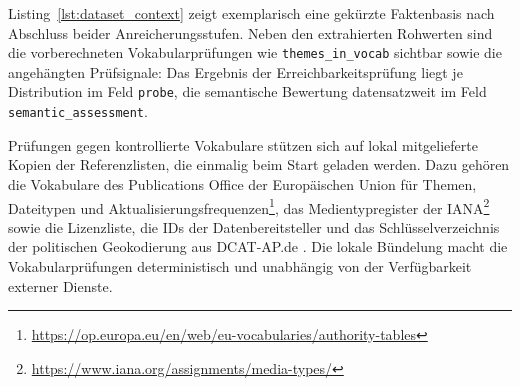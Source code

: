 
Listing~\ref{lst:dataset_context} zeigt exemplarisch eine gekürzte Faktenbasis nach Abschluss beider Anreicherungsstufen. Neben den extrahierten Rohwerten sind die vorberechneten Vokabularprüfungen wie \texttt{themes\_in\_vocab} sichtbar sowie die angehängten Prüfsignale: Das Ergebnis der Erreichbarkeitsprüfung liegt je Distribution im Feld \texttt{probe}, die semantische Bewertung datensatzweit im Feld \texttt{semantic\_assessment}.

\pagebreak

Prüfungen gegen kontrollierte Vokabulare stützen sich auf lokal mitgelieferte Kopien der Referenzlisten, die einmalig beim Start geladen werden. Dazu gehören die Vokabulare des Publications Office der Europäischen Union für Themen, Dateitypen und Aktualisierungsfrequenzen\footnote{\url{https://op.europa.eu/en/web/eu-vocabularies/authority-tables}}, das Medientypregister der IANA\footnote{\url{https://www.iana.org/assignments/media-types/}} sowie die Lizenzliste, die IDs der Datenbereitsteller und das Schlüsselverzeichnis der politischen Geokodierung aus DCAT-AP.de \cite{DCATAPDEImplRules2}. Die lokale Bündelung macht die Vokabularprüfungen deterministisch und unabhängig von der Verfügbarkeit externer Dienste.

